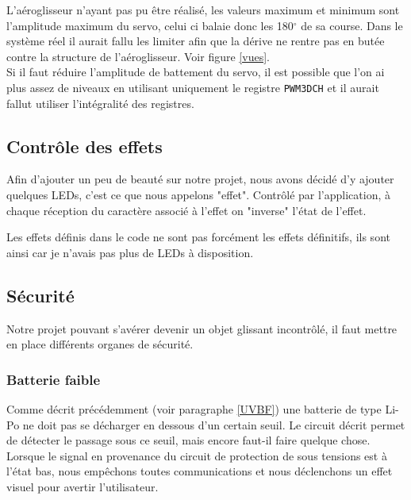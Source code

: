 				\begin{tcolorbox}[center,width=0.9\textwidth, colframe=red!90!orange, colback=orange!25, arc=3mm,boxrule=1mm, sharp corners=east,title=Note]
			L'aéroglisseur n'ayant pas pu être réalisé, les valeurs maximum et minimum sont l'amplitude maximum du servo, celui ci balaie donc les 180$^\circ$ de sa course. Dans le système réel il aurait fallu les limiter afin que la dérive ne rentre pas en butée contre la structure de l'aéroglisseur. Voir figure \ref{vues}.\\
			Si il faut réduire l'amplitude de battement du servo, il est possible que l'on ai plus assez de niveaux en utilisant uniquement le registre \texttt{PWM3DCH} et il aurait fallut utiliser l'intégralité des registres.
  			\end{tcolorbox}
			
			\subsection{Contrôle des effets}
			Afin d'ajouter un peu de beauté sur notre projet, nous avons décidé d'y ajouter quelques LEDs, c'est ce que nous appelons "effet". Contrôlé par l'application, à chaque réception du caractère associé à l'effet on "inverse" l'état de l'effet.
			\begin{tcolorbox}[center,width=0.9\textwidth, colframe=red!90!orange, colback=orange!25, arc=3mm,boxrule=1mm, sharp corners=east,title=Note]
			Les effets définis dans le code ne sont pas forcément les effets définitifs, ils sont ainsi car je n'avais pas plus de LEDs à disposition.
  			\end{tcolorbox}
			
			\subsection{Sécurité}\label{secu}
			Notre projet pouvant s'avérer devenir un objet glissant incontrôlé, il faut mettre en place différents organes de sécurité.
			
				\subsubsection{Batterie faible}
				Comme décrit précédemment (voir paragraphe \ref{UVBF}) une batterie de type Li-Po ne doit pas se décharger en dessous d'un certain seuil. Le circuit décrit permet de détecter le passage sous ce seuil, mais encore faut-il faire quelque chose. Lorsque le signal en provenance du circuit de protection de sous tensions est à l'état bas, nous empêchons toutes communications et nous déclenchons un effet visuel pour avertir l'utilisateur.
